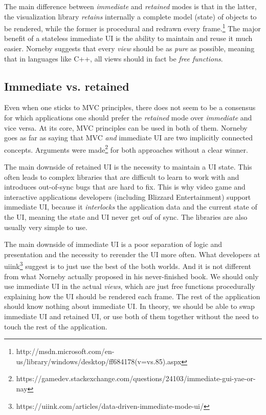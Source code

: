 The main difference between \emph{immediate} and \emph{retained} modes is that in the latter, the visualization library \emph{retains} internally a complete model (state) of objects to be rendered, while the former is procedural and redrawn every frame.\footnote{http://msdn.microsoft.com/en-us/library/windows/desktop/ff684178(v=vs.85).aspx}
The major benefit of a stateless immediate UI is the ability to maintain and reuse it much easier.
Norneby suggests that every \emph{view} should be as \emph{pure} as possible, meaning that in languages like C++, all views should in fact be \emph{free functions}.

\subsection{Immediate vs. retained}

Even when one sticks to MVC principles, there does not seem to be a consensus for which applications one should prefer the \emph{retained} mode over \emph{immediate} and vice versa.
At its core, MVC principles can be used in both of them.
Norneby goes as far as saying that MVC \emph{and} immediate UI are two implicitly connected concepts.
Arguments were made\footnote{https://gamedev.stackexchange.com/questions/24103/immediate-gui-yae-or-nay} for both approaches without a clear winner.

The main downside of retained UI is the necessity to maintain a UI state.
This often leads to complex libraries that are difficult to learn to work with and introduces out-of-sync bugs that are hard to fix.
This is why video game and interactive applications developers (including Blizzard Entertainment) support immediate UI, because it \emph{interlocks} the application data and the current state of the UI, meaning the state and UI never get ouf of sync.
The libraries are also usually very simple to use.

The main downside of immediate UI is a poor separation of logic and presentation and the necessity to rerender the UI more often.
What developers at uiink\footnote{https://uiink.com/articles/data-driven-immediate-mode-ui/} suggest is to just use the best of the both worlds.
And it is not different from what Norneby actually proposed in his never-finished book.
We should only use immediate UI in the actual \emph{views}, which are just free functions procedurally explaining how the UI should be rendered each frame.
The rest of the application should know nothing about immediate UI.
In theory, we should be able to swap immediate UI and retained UI, or use both of them together without the need to touch the rest of the application.

